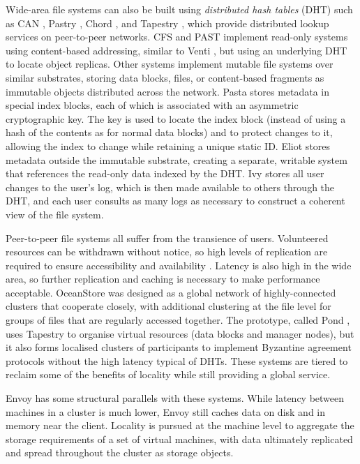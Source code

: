 Wide-area file systems can also be built using \emph{distributed hash tables} (DHT) such as CAN \cite{ratnasamy}, Pastry \cite{rowstron01b}, Chord \cite{stoica}, and Tapestry \cite{zhao01}, which provide distributed lookup services on peer-to-peer networks. CFS \cite{dabek} and PAST \cite{rowstron01a} implement read-only systems using content-based addressing, similar to Venti \cite{quinlan}, but using an underlying DHT to locate object replicas. Other systems implement mutable file systems over similar substrates, storing data blocks, files, or content-based fragments \cite{rabin81} as immutable objects distributed across the network. Pasta \cite{moreton} stores metadata in special index blocks, each of which is associated with an asymmetric cryptographic key. The key is used to locate the index block (instead of using a hash of the contents as for normal data blocks) and to protect changes to it, allowing the index to change while retaining a unique static ID. Eliot \cite{stein02} stores metadata outside the immutable substrate, creating a separate, writable system that references the read-only data indexed by the DHT. Ivy \cite{muthitacharoen02} stores all user changes to the user's log, which is then made available to others through the DHT, and each user consults as many logs as necessary to construct a coherent view of the file system.

Peer-to-peer file systems all suffer from the transience of users. Volunteered resources can be withdrawn without notice, so high levels of replication are required to ensure accessibility and availability \cite{blake,rabin89}. Latency is also high in the wide area, so further replication and caching is necessary to make performance acceptable. OceanStore \cite{kubiatowicz} was designed as a global network of highly-connected clusters that cooperate closely, with additional clustering at the file level for groups of files that are regularly accessed together. The prototype, called Pond \cite{rhea}, uses Tapestry to organise virtual resources (data blocks and manager nodes), but it also forms localised clusters of participants to implement Byzantine agreement protocols without the high latency typical of DHTs. These systems are tiered to reclaim some of the benefits of locality while still providing a global service.

Envoy has some structural parallels with these systems. While latency between machines in a cluster is much lower, Envoy still caches data on disk and in memory near the client. Locality is pursued at the machine level to aggregate the storage requirements of a set of virtual machines, with data ultimately replicated and spread throughout the cluster as storage objects.

